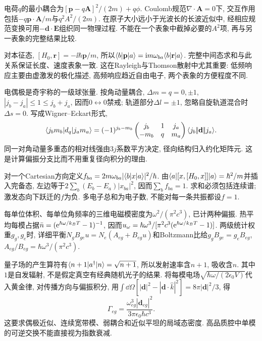 电荷$q$的最小耦合为$[\mathbf p-q\mathbf A]^2/(2m)+q\phi$. Coulomb规范$\nabla\cdot\mathbf A=0$下, 交互作用包括$-q\mathbf p\cdot\mathbf A/m$与$q^2A^2/(2m)$. 在原子大小远小于光波长的长波近似中, 经相应规范变换可用$-\mathbf d\cdot\mathbf E$组织同一物理过程. 不能在一个表象中截掉必要的$A^2$项, 再与另一表象的完整结果比较.

对本征态, $[H_0,\mathbf r]=-\ii\hbar\mathbf p/m$, 所以$\langle b\rvert\mathbf p\lvert a\rangle=\mathrm i m\omega_{ba}\langle b\rvert\mathbf r\lvert a\rangle$. 完整中间态求和与此关系保证长度、速度表象一致. 这在Rayleigh与Thomson散射中尤其重要: 低频响应主要由虚激发的极化描述, 高频响应趋近自由电子, 两个表象的方便程度不同.

电偶极是奇宇称的一级球张量. 按角动量耦合, $\Delta m=q=0,\pm1$, $|j_b-j_a|\le1\le j_b+j_a$, 因而$0\leftrightarrow0$禁戒; 轨道部分$\Delta l=\pm1$, 忽略自旋轨道混合时$\Delta s=0$. 写成Wigner--Eckart形式,
\[\langle j_bm_b\rvert d_q\lvert j_am_a\rangle=(-1)^{j_b-m_b}\begin{pmatrix}j_b&1&j_a\\-m_b&q&m_a\end{pmatrix}\langle j_b\rvert\!\!\left|\mathbf d\right|\!\!\lvert j_a\rangle.\]
同一对角动量多重态的相对线强由$3j$系数平方决定, 径向结构归入约化矩阵元. 这是计算偏振分支比而不用重复径向积分的理由.

对一个Cartesian方向定义$f_{ba}=2m\omega_{ba}|\langle b\rvert x\lvert a\rangle|^2/\hbar$. 由$\langle a\rvert[x,[H_0,x]]\lvert a\rangle=\hbar^2/m$并插入完备态, 左边等于$2\sum_b(E_b-E_a)|x_{ba}|^2$, 因而$\sum_b f_{ba}=1$. 求和必须包括连续谱; 激发态向下跃迁的$f$为负. 多电子总和为电子数, 不能对每一条共振都设$f=1$.

每单位体积、每单位角频率的三维电磁模密度为$\omega^2/(\pi^2c^3)$, 已计两种偏振. 热平均每模占据$\bar n=(\mathrm e^{\hbar\omega/k_BT}-1)^{-1}$, 因而$u_\omega=\hbar\omega^3/[\pi^2c^3(\mathrm e^{\hbar\omega/k_BT}-1)]$. 两级统计权重$g_g,g_e$时, 详细平衡$N_gB_{ge}u=N_e(A_{eg}+B_{eg}u)$和Boltzmann比给$g_gB_{ge}=g_eB_{eg}$,$A_{eg}/B_{eg}=\hbar\omega^3/(\pi^2c^3)$.

量子场的产生算符有$\langle n+1\rvert a^\dagger\lvert n\rangle=\sqrt{n+1}$, 所以发射速率含$n+1$, 吸收含$n$. 其中$1$是自发辐射, 不是假定真空有经典随机光子的结果. 将每模电场$\sqrt{\hbar\omega/(2\epsilon_0V)}$代入黄金律, 对传播方向与偏振积分, 用$\int\dd\Omega[|\mathbf d|^2-|\mathbf d\cdot\hat k|^2]=8\pi|\mathbf d|^2/3$, 得
\begin{equation}\Gamma_{eg}=\frac{\omega_{eg}^3|\mathbf d_{eg}|^2}{3\pi\epsilon_0\hbar c^3}.\label{eq:spont}\end{equation}
这要求偶极近似、连续宽带模、弱耦合和近似平坦的局域态密度. 高品质腔中单模的可逆交换不能直接视为指数衰减.
